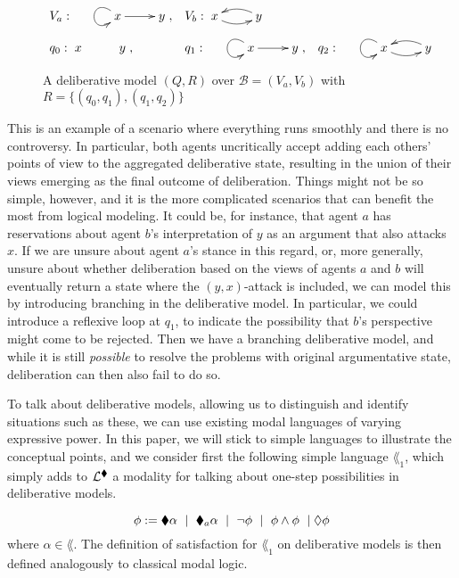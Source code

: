 \documentclass[greybox]{svmult}
\newcommand{\views}{\mathcal B}
\begin{document}
\begin{figure}\label{fig:del1}
$\begin{array}{llllll}
V_a: \xymatrix{& x \ar[r] \ar@(lu,ld) & y}, & V_b: \xymatrix{x \ar@/_/[r] & y \ar@/_/[l] } \\ \\
q_0: \xymatrix{ x & y }, & q_1: \xymatrix{& x \ar@(lu,ld)  \ar[r] & y }, & q_2: \xymatrix{&  x \ar@(lu,ld)  \ar@/_/[r] & y \ar@/_/[l]}
\end{array}$
\caption{A deliberative model $(Q,R)$ over $\views = (V_a,V_b)$ with $R = \{(q_0,q_1),(q_1,q_2)\}$}
\end{figure}

This is an example of a scenario where everything runs smoothly and there is no controversy. In particular, both agents uncritically accept adding each others' points of view to the aggregated deliberative state, resulting in the union of their views emerging as the final outcome of deliberation. Things might not be so simple, however, and it is the more complicated scenarios that can benefit the most from logical modeling. It could be, for instance, that agent $a$ has reservations about agent $b$'s interpretation of $y$ as an argument that also attacks $x$. If we are unsure about agent $a$'s stance in this regard, or, more generally, unsure about whether deliberation based on the views of agents $a$ and $b$ will eventually return a state where the $(y,x)$-attack is included, we can model this by introducing branching in the deliberative model. In particular, we could introduce a reflexive loop at $q_1$, to indicate the possibility that $b$'s perspective might come to be rejected. Then we have a branching deliberative model, and while it is still \emph{possible} to resolve the problems with original argumentative state, deliberation can then also fail to do so. 

To talk about deliberative models, allowing us to distinguish and identify situations such as these, we can use existing modal languages of varying expressive power. In this paper, we will stick to simple languages to illustrate the conceptual points, and we consider first the following simple language $\lang_1$, which simply adds to $\mathcal L^{\blacklozenge}$ a modality for talking about one-step possibilities in deliberative models.

$$
\phi := \blacklozenge \alpha \ \mid \ \blacklozenge_a \alpha \ \mid \ \neg \phi \ \mid \ \phi \land \phi \ \mid \lozenge \phi
$$
where $\alpha \in \lang$. The definition of satisfaction for $\lang_1$ on deliberative models is then defined analogously to classical modal logic.
\end{document}
